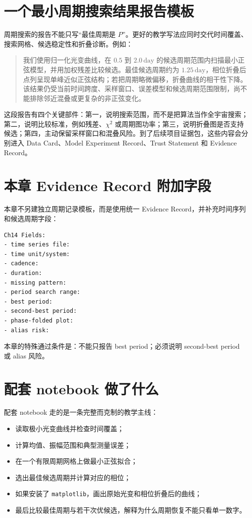 \section{一个最小周期搜索结果报告模板}

周期搜索的报告不能只写“最佳周期是 \(P\)”。更好的教学写法应同时交代时间覆盖、搜索网格、候选稳定性和折叠诊断。例如：

\begin{quote}
我们使用归一化光变曲线，在 \(0.5\) 到 \(2.0\,\mathrm{day}\) 的候选周期范围内扫描最小正弦模型，并用加权残差比较候选。最佳候选周期约为 \(1.25\,\mathrm{day}\)，相位折叠后点列呈现单峰近似正弦结构；若把周期略微偏移，折叠曲线的相干性下降。该结果仍受当前时间跨度、采样窗口、误差模型和候选周期范围限制，尚不能排除邻近混叠或更复杂的非正弦变化。
\end{quote}

这段报告有四个关键部件：第一，说明搜索范围，而不是把算法当作全宇宙搜索；第二，说明比较标准，例如残差、\(\chi^2\) 或周期图功率；第三，说明折叠图是否支持候选；第四，主动保留采样窗口和混叠风险。到了后续项目证据包，这些内容会分别进入 Data Card、Model Experiment Record、Trust Statement 和 Evidence Record。

\section{本章 Evidence Record 附加字段}

本章不另建独立周期记录模板，而是使用统一 Evidence Record，并补充时间序列和候选周期字段：

\begin{examplebox}
\begin{lstlisting}[style=terminal]
Ch14 Fields:
- time series file:
- time unit/system:
- cadence:
- duration:
- missing pattern:
- period search range:
- best period:
- second-best period:
- phase-folded plot:
- alias risk:
\end{lstlisting}
\end{examplebox}

本章的特殊通过条件是：不能只报告 best period；必须说明 second-best period 或 alias 风险。

\section{配套 notebook 做了什么}

配套 notebook 走的是一条完整而克制的教学主线：

\begin{itemize}
    \item 读取极小光变曲线并检查时间覆盖；
    \item 计算均值、振幅范围和典型测量误差；
    \item 在一个有限周期网格上做最小正弦拟合；
    \item 选出最佳候选周期并计算对应的相位；
    \item 如果安装了 \texttt{matplotlib}，画出原始光变和相位折叠后的曲线；
    \item 最后比较最佳周期与若干次优候选，解释为什么周期恢复不能只看单一数字。
\end{itemize}

